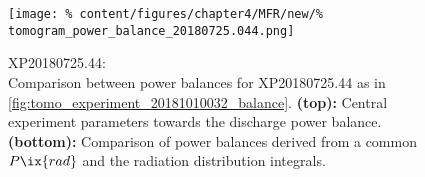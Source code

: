                     \begin{figure}[t]%
                        \centering%
                        \captionsetup{width=.4\textwidth}%
                        \begin{minipage}[c]{.4\textwidth}%
                            \centering%
                            \caption{%
                                XP20180725.44:\\%
                                Comparison between power balances for XP20180725.44 as in \cref{fig:tomo_experiment_20181010032_balance}. \textbf{(top):} Central experiment parameters towards the discharge power balance. \textbf{(bottom):} Comparison of power balances derived from a common $P\ix{rad}$ and the radiation distribution integrals.}\label{fig:tomo_experiment_201810725044_balance}%
                        \end{minipage}%
                        \hfill%
                        \begin{minipage}[c]{0.53\textwidth}%
                            \centering%
                            \texttt{[image: \%
                                content/figures/chapter4/MFR/new/\%
                                tomogram\_power\_balance\_20180725.044.png]}%
                        \end{minipage}%
                    \end{figure}%
%
